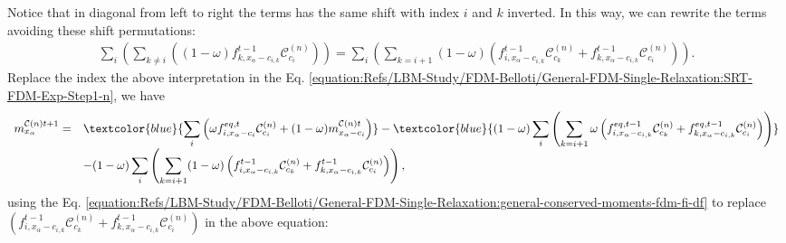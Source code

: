 \documentclass[letterpaper,10pt,english,openany,oneside]{jupyterBook}
\begin{document}
\sphinxAtStartPar
Notice that in diagonal from left to right the terms has the same shift with index \(i\) and \(k\) inverted. In this way, we can rewrite the terms avoiding these shift permutations:
\begin{equation*}
\begin{split}
\displaystyle\sum_{i}\left( \sum_{k\neq i} \left( (1-\omega)f_{k,x_{\alpha}-c_{i,k}}^{t-1} \mathcal{C}_{c_{i}}^{(n)}  \right) \right)= \displaystyle\sum_{i}\left( \sum_{k= i+1} (1-\omega) \left( f_{i,x_{\alpha}-c_{i,k}}^{t-1} \mathcal{C}_{c_{k}}^{(n)} + f_{k,x_{\alpha}-c_{i,k}}^{t-1} \mathcal{C}_{c_{i}}^{(n)} \right) \right).
\end{split}
\end{equation*}
\sphinxAtStartPar
Replace the index the above interpretation in the Eq. \eqref{equation:Refs/LBM-Study/FDM-Belloti/General-FDM-Single-Relaxation:SRT-FDM-Exp-Step1-n}, we have
\begin{equation*}
\begin{split}
\begin{array}{ll}
m_{x_{\alpha}}^{\mathcal{C}(n)t+1} = & \textcolor{blue}{\displaystyle\sum_{i}\left(\omega f_{i,x_{\alpha}-c_{i}}^{eq,t}\mathcal{C}_{c_{i}}^{(n)} + (1-\omega)m_{x_{\alpha}-c_{i}}^{\mathcal{C}(n)t} \right)} - \textcolor{blue}{(1-\omega) \displaystyle\sum_{i}\left( \sum_{k= i+1} \omega \left(f_{i,x_{\alpha}-c_{i,k}}^{eq,t-1} \mathcal{C}_{c_{k}}^{(n)} + f_{k,x_{\alpha}-c_{i,k}}^{eq,t-1} \mathcal{C}_{c_{i}}^{(n)} \right) \right)} \\
&- (1-\omega) \displaystyle\sum_{i}\left( \sum_{k= i+1} (1-\omega)\left(f_{i,x_{\alpha}-c_{i,k}}^{t-1} \mathcal{C}_{c_{k}}^{(n)} + f_{k,x_{\alpha}-c_{i,k}}^{t-1} \mathcal{C}_{c_{i}}^{(n)} \right) \right),
\end{array}
\end{split}
\end{equation*}
\sphinxAtStartPar
using the Eq. \eqref{equation:Refs/LBM-Study/FDM-Belloti/General-FDM-Single-Relaxation:general-conserved-moments-fdm-fi-df} to replace \(\left(f_{i,x_{\alpha}-c_{i,k}}^{t-1} \mathcal{C}_{c_{k}}^{(n)} + f_{k,x_{\alpha}-c_{i,k}}^{t-1} \mathcal{C}_{c_{i}}^{(n)} \right)\) in the above equation:
\end{document}

